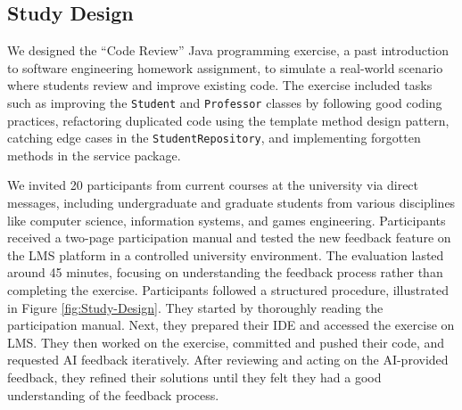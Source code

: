 \documentclass[manuscript,screen,review, anonymous]{acmart}
\begin{document}

\subsection{Study Design}
We designed the ``Code Review'' Java programming exercise, a past introduction to software engineering homework assignment, to simulate a real-world scenario where students review and improve existing code.
The exercise included tasks such as improving the \texttt{Student} and \texttt{Professor} classes by following good coding practices, refactoring duplicated code using the template method design pattern, catching edge cases in the \texttt{StudentRepository}, and implementing forgotten methods in the service package.

We invited 20 participants from current courses at the university via direct messages, including undergraduate and graduate students from various disciplines like computer science, information systems, and games engineering. 
Participants received a two-page participation manual and tested the new feedback feature on the LMS platform in a controlled university environment. 
The evaluation lasted around 45 minutes, focusing on understanding the feedback process rather than completing the exercise.
Participants followed a structured procedure, illustrated in Figure \ref{fig:Study-Design}.
They started by thoroughly reading the participation manual.
Next, they prepared their IDE and accessed the exercise on LMS.
They then worked on the exercise, committed and pushed their code, and requested AI feedback iteratively.
After reviewing and acting on the AI-provided feedback, they refined their solutions until they felt they had a good understanding of the feedback process.
\end{document}
